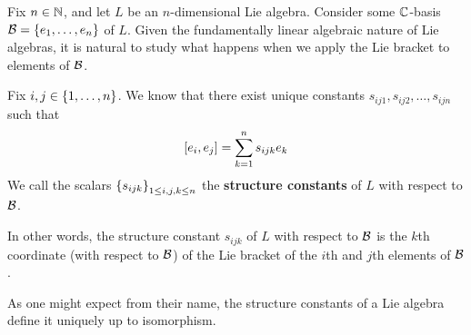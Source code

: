 Fix $n \in \mathbb{N}$, and let $L$ be an $n$-dimensional Lie algebra. Consider some $\mathbb{C}$-basis $\mathcal{B} = \left\{ e_1, \ldots, e_n \right\}$ of $L$. Given the fundamentally linear algebraic nature of Lie algebras, it is natural to study what happens when we apply the Lie bracket to elements of $\mathcal{B}$.

\begin{boxdefinition}\label{Ch1:Def:StructureConstants}
    Fix $i, j \in \left\{ 1, \ldots, n \right\}$. We know that there exist unique constants $s_{ij1}, s_{ij2}, \ldots, s_{ijn}$ such that
    \begin{align*}
        \left[ e_i, e_j \right] = \sum_{k = 1}^{n} s_{ijk} e_k
    \end{align*}
    We call the scalars $\left\{ s_{ijk} \right\}_{1 \leq i, j, k \leq n}$ the \textbf{structure constants} of $L$ with respect to $\mathcal{B}$.
\end{boxdefinition}

In other words, the structure constant $s_{ijk}$ of $L$ with respect to $\mathcal{B}$ is the $k$th coordinate (with respect to $\mathcal{B}$) of the Lie bracket of the $i$th and $j$th elements of $\mathcal{B}$.

As one might expect from their name, the structure constants of a Lie algebra define it uniquely up to isomorphism.

